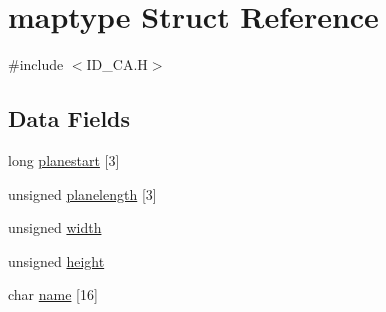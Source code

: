 \hypertarget{structmaptype}{
\section{maptype Struct Reference}
\label{structmaptype}
}


{\ttfamily \#include $<$ID\_\-CA.H$>$}

\subsection*{Data Fields}
\begin{DoxyCompactItemize}
\item 
long \hyperlink{structmaptype_aada2e9a46239cff88af7f433a124bc85}{planestart} \mbox{[}3\mbox{]}
\item 
unsigned \hyperlink{structmaptype_a1a9d64fac15753bbae61f252e1b3bd7a}{planelength} \mbox{[}3\mbox{]}
\item 
unsigned \hyperlink{structmaptype_aa077c64d4805d9952378d9926bd0ccb0}{width}
\item 
unsigned \hyperlink{structmaptype_aafa8427a59c612d538eda3f93ba6c15a}{height}
\item 
char \hyperlink{structmaptype_a787c058c46642a7c15b942b67b93fcc6}{name} \mbox{[}16\mbox{]}
\end{DoxyCompactItemize}



